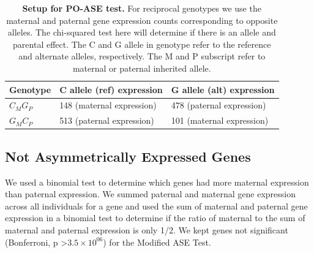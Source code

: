\begin{table}[!htb]
\centering
\begin{tabular}{@{}p{3cm}|p{5cm}p{5cm}@{}}
 \toprule  Genotype & C allele (ref) expression & G allele (alt) expression \\ \midrule
 $C_{M}G_{P}$ & 148  (maternal expression) & 478 (paternal expression) \\
 $G_{M}C_{P}$ & 513 (paternal expression) & 101 (maternal expression) \\
 \bottomrule
\end{tabular}
\caption[Setup for PO-ASE test.]{\textbf{Setup for PO-ASE test.} For reciprocal genotypes we use the maternal and paternal gene expression counts corresponding to opposite alleles. The chi-squared test here will determine if there is an allele and parental effect. The C and G allele in genotype refer to the reference and alternate alleles, respectively. The M and P subscript refer to maternal or paternal inherited allele.}
\label{tab:chi}
\end{table}



\subsection{Not Asymmetrically Expressed Genes}\label{Not Asymmetrically Expressed Genes}
We used a binomial test to determine which genes had more maternal expression than paternal expression. We summed paternal and maternal gene expression across all individuals for a gene and used the sum of maternal and paternal gene expression in a binomial test to determine if the ratio of maternal to the sum of maternal and paternal expression is only 1/2. We kept genes not significant (Bonferroni, p \textgreater $3.5 \times 10^{06}$) for the Modified ASE Test. 




